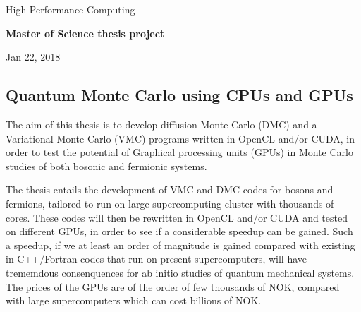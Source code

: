 \documentclass[%
oneside,                 %
final,                   %
10pt]{article}
\begin{document}

\newcommand{\exercisesection}[1]{\subsection*{#1}}






\thispagestyle{empty}

\begin{center}
{\LARGE\bf
\begin{spacing}{1.25}
High-Performance Computing 
\end{spacing}
}
\end{center}


\begin{center}
{\bf Master of Science thesis project${}^{}$} \\ [0mm]
\end{center}

\begin{center}
\end{center}
    

\begin{center}
Jan 22, 2018
\end{center}

\vspace{1cm}


\subsection{Quantum Monte Carlo using CPUs and GPUs}

The aim of this thesis is to develop  diffusion Monte Carlo (DMC) and a Variational
Monte Carlo (VMC) programs written in OpenCL and/or CUDA, in order to test the potential
of Graphical processing units (GPUs) in Monte Carlo studies of both bosonic and fermionic systems.

The thesis entails the development of  VMC and DMC codes for bosons and fermions,
tailored to run on large supercomputing cluster with thousands of cores.
These codes will then be rewritten in OpenCL and/or CUDA and tested on different GPUs,
in order to see if a considerable speedup can be gained.
Such a speedup, if we at least an order of magnitude is gained compared 
with existing in C++/Fortran codes that run on present  supercomputers, will have trememdous consenquences for ab initio studies of quantum mechanical systems.  The prices of the GPUs are of the order of few thousands of NOK, compared
with large supercomputers which can cost billions of NOK. 
\end{document}
